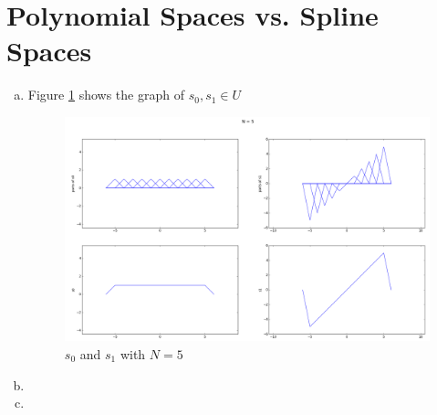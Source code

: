 \section{Polynomial Spaces vs. Spline Spaces}\label{sec:p4}

\begin{enumerate}[(a)]
\item Figure \ref{fig:p4a} shows the graph of $s_0, s_1 \in U$
\begin{figure}[htbp]
	\centering
	\includegraphics[width=\linewidth]{images/p4a}
	\caption{$s_0$ and $s_1$ with $N=5$}
	\label{fig:p4a}
\end{figure}

\item
\item
\end{enumerate}